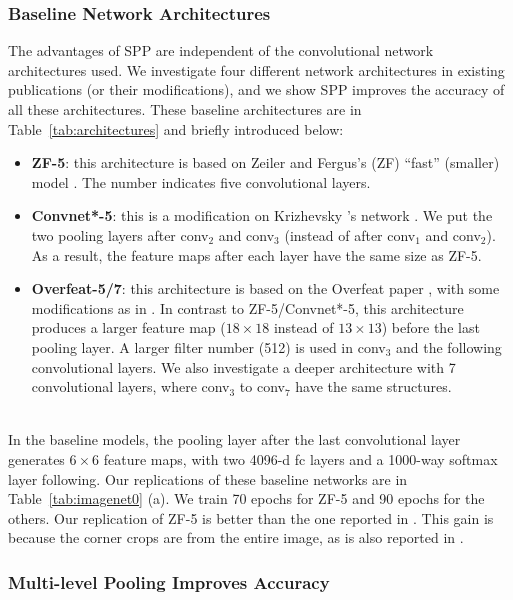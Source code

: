 \documentclass[10pt,journal,cspaper,compsoc]{IEEEtran}
\begin{document}
\subsubsection{Baseline Network Architectures}

The advantages of SPP are independent of the convolutional network architectures used. We investigate four different network architectures in existing publications \cite{Krizhevsky2012,Zeiler2013,Sermanet2013} (or their modifications), and we show SPP improves the accuracy of all these architectures. These baseline architectures are in Table~\ref{tab:architectures} and briefly introduced below:

\begin{itemize}
  \item \textbf{ZF-5}: this architecture is based on Zeiler and Fergus's (ZF) ``fast'' (smaller) model \cite{Zeiler2013}. The number indicates five convolutional layers.
  \item \textbf{Convnet*-5}: this is a modification on Krizhevsky \etal's network \cite{Krizhevsky2012}. We put the two pooling layers after conv$_2$ and conv$_3$ (instead of after conv$_1$ and conv$_2$). As a result, the feature maps after each layer have the same size as ZF-5.
  \item \textbf{Overfeat-5/7}: this architecture is based on the Overfeat paper \cite{Sermanet2013}, with some modifications as in \cite{Chatfield2014}. In contrast to ZF-5/Convnet*-5, this architecture produces a larger feature map ($18\times18$ instead of $13\times13$) before the last pooling layer. A larger filter number (512) is used in conv$_3$ and the following convolutional layers. We also investigate a deeper architecture with 7 convolutional layers, where conv$_3$ to conv$_7$ have the same structures.
\end{itemize}
~\\
In the baseline models, the pooling layer after the last convolutional layer generates $6\times6$ feature maps, with two 4096-d fc layers and a 1000-way softmax layer following.
Our replications of these baseline networks are in Table~\ref{tab:imagenet0} (a). We train 70 epochs for ZF-5 and 90 epochs for the others.
Our replication of ZF-5 is better than the one reported in \cite{Zeiler2013}. This gain is because the corner crops are from the entire image, as is also reported in \cite{Howard2013}.

\subsubsection{Multi-level Pooling Improves Accuracy}
\label{subsec:multi_level_pooling}
\end{document}
